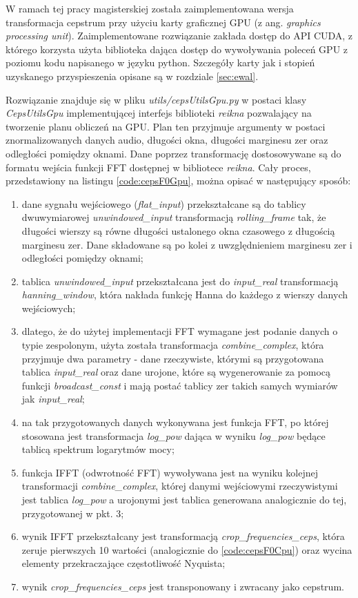 \documentclass[12pt,a4paper,twoside]{mwart}
\begin{document}
W ramach tej pracy magisterskiej została zaimplementowana wersja transformacja cepstrum przy użyciu karty graficznej GPU (z ang. \textit{graphics processing unit}). Zaimplementowane rozwiązanie zakłada dostęp do API CUDA, z którego korzysta użyta biblioteka dająca dostęp do wywoływania poleceń GPU z poziomu kodu napisanego w języku python. Szczegóły karty jak i stopień uzyskanego przyspieszenia opisane są w rozdziale \ref{sec:ewal}.

Rozwiązanie znajduje się w pliku \textit{utils/cepsUtilsGpu.py} w postaci klasy \textit{CepsUtilsGpu} implementującej interfejs biblioteki \textit{reikna} pozwalający na tworzenie planu obliczeń na GPU. Plan ten przyjmuje argumenty w postaci znormalizowanych danych audio, długości okna, długości marginesu zer oraz odległości pomiędzy oknami. Dane poprzez transformację dostosowywane są do formatu wejścia funkcji FFT dostępnej w bibliotece \textit{reikna}. Cały proces, przedstawiony na listingu \ref{code:cepsF0Gpu}, można opisać w następujący sposób:
\begin{enumerate}
  \item dane sygnału wejściowego (\textit{flat\_input}) przekształcane są do tablicy dwuwymiarowej \textit{unwindowed\_input} transformacją \textit{rolling\_frame} tak, że długości wierszy są równe długości ustalonego okna czasowego z długością marginesu zer. Dane składowane są po kolei z uwzględnieniem marginesu zer i odległości pomiędzy oknami;
  \item tablica \textit{unwindowed\_input} przekształcana jest do \textit{input\_real} transformacją \textit{hanning\_window}, która nakłada funkcję Hanna do każdego z wierszy danych wejściowych;
  \item dlatego, że do użytej implementacji FFT wymagane jest podanie danych o typie zespolonym, użyta została transformacja \textit{combine\_complex}, która przyjmuje dwa parametry - dane rzeczywiste, którymi są przygotowana tablica \textit{input\_real} oraz dane urojone, które są wygenerowanie za pomocą funkcji \textit{broadcast\_const} i mają postać tablicy zer takich samych wymiarów jak \textit{input\_real};
  \item na tak przygotowanych danych wykonywana jest funkcja FFT, po której stosowana jest transformacja \textit{log\_pow} dająca w wyniku \textit{log\_pow} będące tablicą spektrum logarytmów mocy;
  \item funkcja IFFT (odwrotność FFT) wywoływana jest na wyniku kolejnej transformacji  \textit{combine\_complex}, której danymi wejściowymi rzeczywistymi jest tablica \textit{log\_pow} a urojonymi jest tablica generowana analogicznie do tej, przygotowanej w pkt. 3;
  \item wynik IFFT przekształcany jest transformacją \textit{crop\_frequencies\_ceps}, która zeruje pierwszych 10 wartości (analogicznie do \ref{code:cepsF0Cpu}) oraz wycina elementy przekraczające częstotliwość Nyquista;
  \item wynik \textit{crop\_frequencies\_ceps} jest transponowany i zwracany jako cepstrum.
\end{enumerate}
\end{document}
